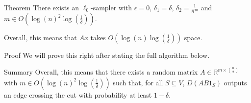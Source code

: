 \documentclass[a4paper]{article}
\begin{document}
\begin{parag}{Theorem}
    There exists an $\ell_0$-sampler with $\epsilon = 0$, $\delta_1 = \delta$, $\delta_2 = \frac{1}{n^{10}}$ and $m \in O\left(\log\left(n\right)^2 \log\left(\frac{1}{\delta}\right)\right)$.

    Overall, this means that $A x$ takes $O\left(\log\left(n\right) \log\left(\frac{1}{\delta}\right)\right)$ space.

    \begin{subparag}{Proof}
        We will prove this right after stating the full algorithm below.
    \end{subparag}

    \begin{subparag}{Summary}
        Overall, this means that there exists a random matrix $A \in \mathbb{R}^{m \times \binom{n}{2}}$ with $m\in O\left(\log\left(n\right)^2 \log\left(\frac{1}{\delta}\right)\right)$ such that, for all $S \subseteq V$, $D\left(A B 1_S\right)$ outputs an edge crossing the cut with probability at least $1 - \delta$.
    \end{subparag}
\end{parag}
\end{document}
